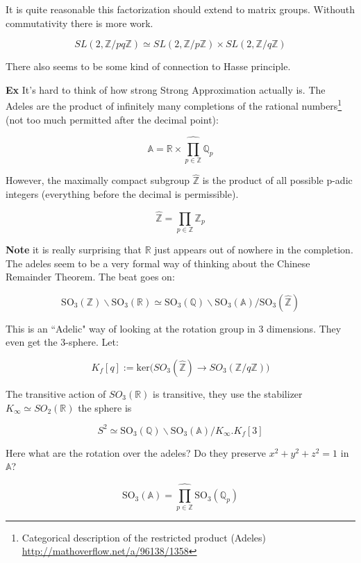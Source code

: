 \documentclass[12pt]{article}
\begin{document}
{\noindent It is quite reasonable this factorization should extend to matrix groups.  Withouth commutativity there is more work.

$$ SL(2,\mathbb{Z}/pq\mathbb{Z}) \simeq SL(2,\mathbb{Z}/p\mathbb{Z}) \times SL(2,\mathbb{Z}/q\mathbb{Z})$$

\noindent There also seems to be some kind of connection to Hasse principle. \newline 

\noindent \textbf{Ex} It's hard to think of how strong Strong Approximation actually is.  The Adeles are the product of infinitely many completions of the rational numbers\footnote{ Categorical description of the restricted product (Adeles) \url{http://mathoverflow.net/a/96138/1358}} (not too much permitted after the decimal point):

$$ \mathbb{A} = \mathbb{R} \times \hat{\prod_{p \in \mathbb{Z}}} \mathbb{Q}_p $$

\noindent However, the maximally compact subgroup $\hat{\mathbb{Z}}$ is the product of all possible p-adic integers (everything before the decimal is permissible).

$$ \widehat{\mathbb{Z}} =  \prod_{p \in \mathbb{Z}} \mathbb{Z}_p $$

\noindent \textbf{Note} it is really surprising that $\mathbb{R}$ just appears out of nowhere in the completion.  The adeles seem to be a very formal way of thinking about the Chinese Remainder Theorem.  The beat goes on:  

$$ \mathrm{SO}_3(\mathbb{Z}) \backslash \mathrm{SO}_3(\mathbb{R}) \simeq 
\mathrm{SO}_3(\mathbb{Q}) \backslash \mathrm{SO}_3(\mathbb{A})/\mathrm{SO}_3(\widehat{\mathbb{Z}})$$

\noindent This is an ``Adelic" way of looking at the rotation group in 3 dimensions.  They even get the 3-sphere. Let:

$$ K_f[q] := \mathrm{ker} \bigg( SO_3(\widehat{\mathbb{Z}}) \to SO_3(\mathbb{Z}/q\mathbb{Z})\bigg)$$

\noindent The transitive action of $SO_3(\mathbb{R})$ is transitive, they use the stabilizer $K_\infty \simeq  SO_2(\mathbb{R})$ the sphere is

$$ S^2 \simeq  \mathrm{SO}_3(\mathbb{Q}) \backslash \mathrm{SO}_3(\mathbb{A})/K_\infty.K_f[3] $$

\noindent Here what are the rotation over the adeles?  Do they preserve $x^2 + y^2 + z^2 = 1$ in $\mathbb{A}$?

$$ \mathrm{SO}_3(\mathbb{A}) = \hat{\prod_{p \in \mathbb{Z}} }\mathrm{SO}_3(\mathbb{Q}_p)$$

}
\end{document}
